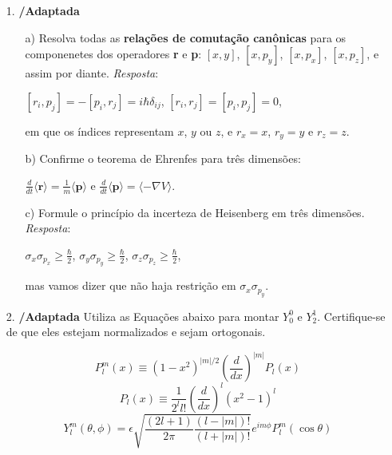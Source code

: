 \begin{itemize}
    \item[1.] \textbf{\cite{Griffiths2011}/Adaptada} 
    \begin{itemize}
        \item[a)] Resolva todas as \textbf{relações de comutação canônicas} para os componenetes dos operadores \textbf{r} e \textbf{p}: $[x,y]$, $[x,p_y]$, $[x,p_x]$, $[x,p_z]$, e assim por diante. \textit{Resposta}:
        \begin{center}
            $[r_i,p_j]=-[p_i,r_j]=i \hbar \delta_{ij}$, $[r_i,r_j]=[p_i,p_j]=0$,
        \end{center}
        em que os índices representam $x$, $y$ ou $z$, e $r_x=x$, $r_y=y$ e $r_z=z$.

        \item[b)] Confirme o teorema de Ehrenfes para três dimensões:
        \begin{center}
            $\frac{d}{dt} \langle \textbf{r} \rangle = \frac{1}{m} \langle \textbf{p} \rangle$ e $\frac{d}{dt}\langle \textbf{p} \rangle = \langle - \nabla V \rangle.$
        \end{center}

        \item[c)] Formule o princípio da incerteza de Heisenberg em três dimensões. \textit{Resposta}:
        \begin{center}
            $\sigma_x \sigma_{p_x} \geq \frac{\hbar}{2}$, $\sigma_y \sigma_{p_y} \geq \frac{\hbar}{2}$, $\sigma_z \sigma_{p_z} \geq \frac{\hbar}{2}$,
        \end{center}
        mas vamos dizer que não haja restrição em $\sigma_x \sigma_{p_y}$.
    \end{itemize}

    \item[2.] \textbf{\cite{Griffiths2011}/Adaptada} Utiliza as Equações abaixo para montar $Y^{0}_{0}$ e $Y^{1}_{2}$. Certifique-se de que eles estejam normalizados e sejam ortogonais.

    \begin{equation*}
        P^{m}_{l}(x) \equiv (1-x^2)^{|m|/2}\left( \frac{d}{dx} \right)^{|m|}P_{l}(x)
    \end{equation*}
    \begin{equation*}
        P_{l}(x) \equiv \frac{1}{2^l l!}\left( \frac{d}{dx} \right)^l (x^2-1)^l
    \end{equation*}
    \begin{equation*}
        Y^{m}_{l}(\theta,\phi) = \epsilon\sqrt{\frac{(2l+1)}{2 \pi}\frac{(l-|m|)!}{(l+|m|)!}}e^{im\phi}P^{m}_{l}( \cos \theta)
    \end{equation*} 
\end{itemize}